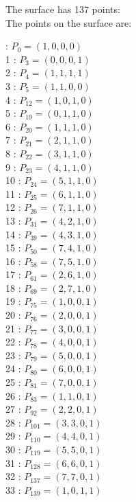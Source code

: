\documentclass{article}
\begin{document}
{$$$$
The surface has 137 points:\\
The points on the surface are:\\
\begin{multicols}{3}
 : $P_{0}=( 1, 0, 0, 0 )$\\
1 : $P_{3}=( 0, 0, 0, 1 )$\\
2 : $P_{4}=( 1, 1, 1, 1 )$\\
3 : $P_{5}=( 1, 1, 0, 0 )$\\
4 : $P_{12}=( 1, 0, 1, 0 )$\\
5 : $P_{19}=( 0, 1, 1, 0 )$\\
6 : $P_{20}=( 1, 1, 1, 0 )$\\
7 : $P_{21}=( 2, 1, 1, 0 )$\\
8 : $P_{22}=( 3, 1, 1, 0 )$\\
9 : $P_{23}=( 4, 1, 1, 0 )$\\
10 : $P_{24}=( 5, 1, 1, 0 )$\\
11 : $P_{25}=( 6, 1, 1, 0 )$\\
12 : $P_{26}=( 7, 1, 1, 0 )$\\
13 : $P_{31}=( 4, 2, 1, 0 )$\\
14 : $P_{39}=( 4, 3, 1, 0 )$\\
15 : $P_{50}=( 7, 4, 1, 0 )$\\
16 : $P_{58}=( 7, 5, 1, 0 )$\\
17 : $P_{61}=( 2, 6, 1, 0 )$\\
18 : $P_{69}=( 2, 7, 1, 0 )$\\
19 : $P_{75}=( 1, 0, 0, 1 )$\\
20 : $P_{76}=( 2, 0, 0, 1 )$\\
21 : $P_{77}=( 3, 0, 0, 1 )$\\
22 : $P_{78}=( 4, 0, 0, 1 )$\\
23 : $P_{79}=( 5, 0, 0, 1 )$\\
24 : $P_{80}=( 6, 0, 0, 1 )$\\
25 : $P_{81}=( 7, 0, 0, 1 )$\\
26 : $P_{83}=( 1, 1, 0, 1 )$\\
27 : $P_{92}=( 2, 2, 0, 1 )$\\
28 : $P_{101}=( 3, 3, 0, 1 )$\\
29 : $P_{110}=( 4, 4, 0, 1 )$\\
30 : $P_{119}=( 5, 5, 0, 1 )$\\
31 : $P_{128}=( 6, 6, 0, 1 )$\\
32 : $P_{137}=( 7, 7, 0, 1 )$\\
33 : $P_{139}=( 1, 0, 1, 1 )$\\

\end{multicols}}
\end{document}
